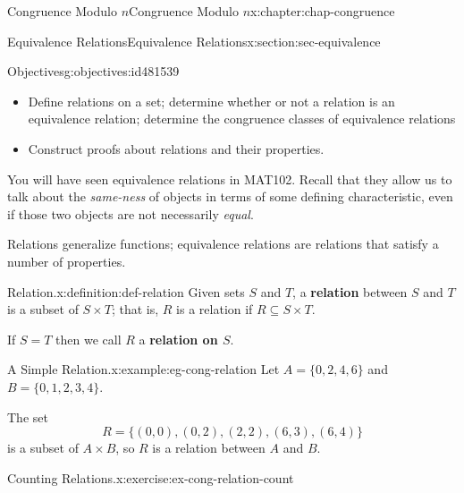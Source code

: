 \documentclass[oneside,10pt,]{book}
\newcommand{\terminology}[1]{\textbf{#1}}
\numberwithin{equation}{section}
\begin{document}
%
%
\typeout{************************************************}
\typeout{************************************************}
%
\begin{chapterptx}{Congruence Modulo \(n\)}{}{Congruence Modulo \(n\)}{}{}{x:chapter:chap-congruence}
%
%
\typeout{************************************************}
\typeout{************************************************}
%
\begin{sectionptx}{Equivalence Relations}{}{Equivalence Relations}{}{}{x:section:sec-equivalence}
\begin{objectives}{Objectives}{g:objectives:id481539}
%
\begin{itemize}[label=\textbullet]
\item{}Define relations on a set; determine whether or not a relation is an equivalence relation; determine the congruence classes of equivalence relations%
\item{}Construct proofs about relations and their properties.%
\end{itemize}
\end{objectives}
You will have seen equivalence relations in MAT102. Recall that they allow us to talk about the \emph{same-ness} of objects in terms of some defining characteristic, even if those two objects are not necessarily \emph{equal}.%
\par
Relations generalize functions; equivalence relations are relations that satisfy a number of properties.%
\begin{definition}{Relation.}{x:definition:def-relation}%
Given sets \(S\) and \(T\), a \terminology{relation} between \(S\) and \(T\) is a subset of \(S \times T\); that is, \(R\) is a relation if \(R \subseteq S \times T\).%
\par
If \(S = T\) then we call \(R\) a \terminology{relation on \(S\)}.%
\end{definition}
\begin{example}{A Simple Relation.}{x:example:eg-cong-relation}%
Let \(A = \{0,2,4,6\}\) and \(B = \{0,1,2,3,4\}\).%
\par
The set%
\begin{equation*}
R = \{(0,0),(0,2),(2,2),(6,3),(6,4)\}
\end{equation*}
is a subset of \(A \times B\), so \(R\) is a relation between \(A\) and \(B\).%
\end{example}
\begin{inlineexercise}{Counting Relations.}{x:exercise:ex-cong-relation-count}%

\end{inlineexercise}
\end{sectionptx}
\end{chapterptx}
\end{document}
